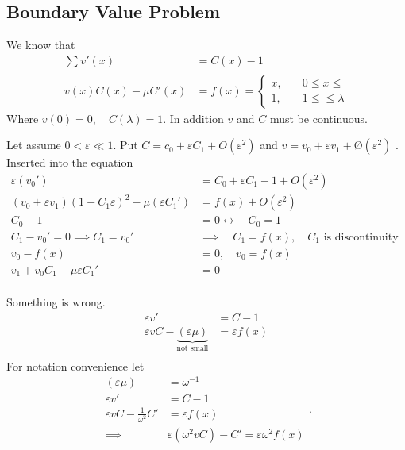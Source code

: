 \documentclass{article}
\theoremstyle{remark}
\newcommand{\newpara}
  {
  \vskip 0.4cm
  }
\begin{document}
\subsection{Boundary Value Problem}%
\label{sub:boundary_value_problem}

We know that \[
  \begin{split}
\sum_{}^{} v' \left( x \right)  & = C\left( x \right) - 1 \\
v\left( x \right)C\left( x \right) - \mu  C' \left( x \right)  & = f\left( x \right) = \begin{cases}
  x,  &  \quad  0 \le x \le \\
  1,  &  \quad  1 \le \le \lambda   
\end{cases}
    \end{split} 
\] 
Where  $v\left( 0 \right) = 0, \quad    C\left( \lambda  \right)  =1 $.
In addition $v$ and $C$ must be continuous. 

\newpara
Let assume $ 0 < \varepsilon  \ll  1$. Put $C = c_{0} + \varepsilon  C_{1} + O \left( \varepsilon ^2 \right)$ and $v = v_{0} + \varepsilon  v_{1} + Ø\left( \varepsilon ^2 \right)$ . Inserted into the equation \[
  \begin{split}
\varepsilon \left( v_{0}'   \right) &=  C_{0} + \varepsilon C_{1} - 1 + O\left( \varepsilon ^2 \right)  \\
\left( v_{0} + \varepsilon  v_{1} \right) \left( 1 + C_{1} \varepsilon  \right) ^2 - \mu \left(  \varepsilon  C_{1}'    \right)  &  = f\left( x \right) + O\left( \varepsilon ^2 \right)   \\
C_{0} - 1 &=  0 \leftrightarrow  \quad  C_{0} = 1  \\
C_{1} - v_{0}'  =  0  \implies  C_{1} = v_{0}'    & \implies \quad C_{1} = f\left( x \right) , \quad C_{1}\text{ is discontinuity }    \\
v_{0} - f\left( x \right) &=  0, \quad v_{0} = f\left( x \right)   \\
v_{1} + v_{0} C_{1} - \mu \varepsilon C_{1}'  &=  0 \\
  \end{split} 
\] 

Something is wrong. 
\[
\begin{split}
  \varepsilon  v'  &=  C- 1 \\
  \varepsilon  v C - \underbrace{\left( \varepsilon  \mu  \right)}_{ \text{not small} }  &=  \varepsilon f\left( x \right) \\
\end{split} 
\] 
For notation convenience let \[
\begin{split}
  \left( \varepsilon  \mu  \right) &= \omega ^{-1}   \\
  \varepsilon v'  &=  C - 1 \\
  \varepsilon vC - \frac{1}{\omega ^{2}} C'  &=  \varepsilon  f\left( x \right) \\
  \implies   &  \varepsilon \left( \omega ^2 v C \right) - C'  = \varepsilon  \omega ^2 f\left( x \right)
\end{split} .
\] 
\end{document}
